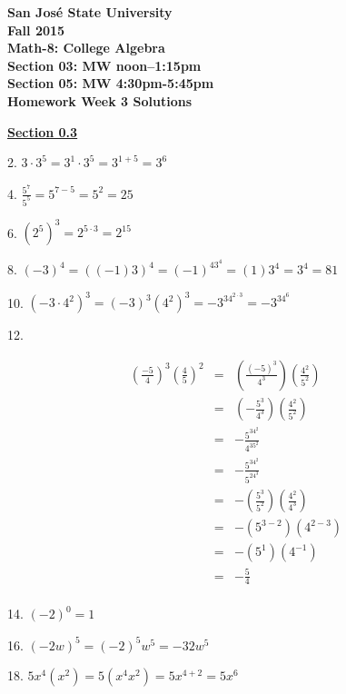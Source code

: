 \documentclass[letterpaper]{article}
\begin{document}
\begin{center}
\bfseries
San Jos\'{e} State University \\
Fall 2015 \\
Math-8: College Algebra \\
Section 03: MW noon--1:15pm \\
Section 05: MW 4:30pm-5:45pm \\
\bigskip
Homework Week 3 Solutions
\end{center}

\underline{\textbf{Section 0.3}}

\bigskip

2. $3\cdot3^5=3^1\cdot3^5=3^{1+5}=3^6$

\bigskip

4. $\frac{5^7}{5^5}=5^{7-5}=5^2=25$

\bigskip

6. $(2^5)^3=2^{5\cdot3}=2^{15}$

\bigskip

8. $(-3)^4=((-1)3)^4=(-1)^43^4=(1)3^4=3^4=81$

\bigskip

10. $(-3\cdot4^2)^3=(-3)^3(4^2)^3=-3^34^{2\cdot3}=-3^34^6$

\bigskip

12.

\begin{eqnarray*}
\left(\frac{-5}{4}\right)^3\left(\frac{4}{5}\right)^2 &=&
    \left(\frac{(-5)^3}{4^3}\right)\left(\frac{4^2}{5^2}\right) \\
    &=& \left(-\frac{5^3}{4^3}\right)\left(\frac{4^2}{5^2}\right) \\
    &=& -\frac{5^34^2}{4^35^2} \\
    &=& -\frac{5^34^2}{5^24^3} \\
    &=& -\left(\frac{5^3}{5^2}\right)\left(\frac{4^2}{4^3}\right) \\
    &=& -(5^{3-2})(4^{2-3}) \\
    &=& -(5^1)(4^{-1}) \\
    &=& -\frac{5}{4} \\
\end{eqnarray*}

14. $(-2)^0=1$

\bigskip

16. $(-2w)^5=(-2)^5w^5=-32w^5$

\bigskip

18. $5x^4(x^2)=5(x^4x^2)=5x^{4+2}=5x^6$

\bigskip
\end{document}

